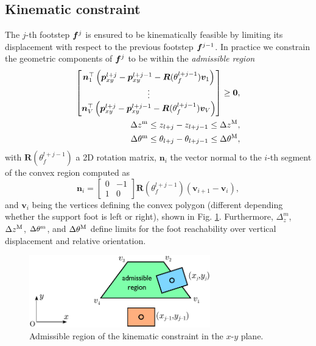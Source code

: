 \subsection{Kinematic constraint}
The $j$-th footstep ${\bm{f}}^{j}$ is ensured to be kinematically feasible by
limiting its displacement with respect to the previous footstep ${\bm{f}}^{j-1}$.
In practice we constrain the geometric components of ${\bm{f}}^{j}$ to be within
the \textit{admissible region}
\begin{equation}
\label{eq:FAPA:kinematic-constraint}
\begin{split}
\begin{bmatrix}
    \bm{n}_1^\top\left(\bm{p}_{xy}^{l+j} - \bm{p}_{xy}^{l+j-1} - \bm{R}(\theta_f^{l+j-1})\bm{v}_1\right) \\
    \vdots \\
    \bm{n}_V^\top\left(\bm{p}_{xy}^{l+j} - \bm{p}_{xy}^{l+j-1} - \bm{R}(\theta_f^{l+j-1})\bm{v}_V\right) \\
\end{bmatrix} \ge \bm{0},\\
    \Delta z^{\rm m} \le z_{l+j} - z_{l+j-1} \le \Delta z^{\rm M}, \\
    \Delta \theta^{\rm m} \le \theta_{l+j} - \theta_{l+j-1} \le \Delta \theta^{\rm M}, 
\end{split}
\end{equation}
with $\bm{R}\left(\theta_f^{l+j-1}\right)$ a 2D rotation matrix, $\bm{n}_i$ the vector
normal to the $i$-th segment of the convex region computed as
\begin{equation*}
    \bm{n}_i =
    \begin{bmatrix}
        0 & -1 \\ 1 & 0
    \end{bmatrix}
    \bm{R}\left(\theta_f^{l+j-1}\right)(\bm{v}_{i+1}-\bm{v}_i),
\end{equation*}
and $\bm{v}_i$ being the vertices defining the convex polygon (different
depending whether the support foot is left or right), shown in
Fig. \ref{fig:FAPA:kinematic-constraint}. Furthermore,
$\Delta_z^m$, $\Delta z^{\rm M}$, $\Delta \theta^{\rm m}$, and
$\Delta \theta^{\rm M}$ define limits for the foot reachability over vertical
displacement and relative orientation.

\begin{figure}
    \centering
    \includegraphics[width=0.7\textwidth]{figures/humanoids_kinconstr.pdf}
    \caption{Admissible region of the kinematic constraint in the $x$-$y$ plane.}
    \label{fig:FAPA:kinematic-constraint}
\end{figure}

